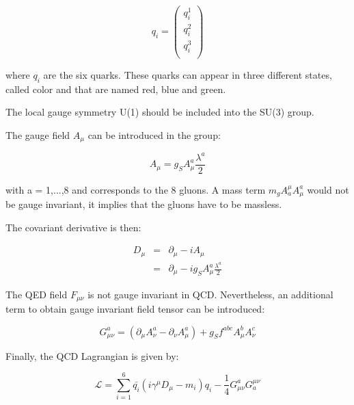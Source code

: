    \begin{equation}
      q_i = 
        \begin{pmatrix}
          q_i^1 \\
          q_i^2 \\
          q_i^3 \\
        \end{pmatrix}
     \end{equation}
    
    where $q_i$ are the six quarks.
    These quarks can appear in three different states, called color and that are named red, blue and green.

    The local gauge symmetry U(1) should be included into the SU(3) group.
    
    The gauge field $A_{\mu}$ can be introduced in the group:
    
    \begin{equation}
      A_{\mu} = g_S A^a_{\mu}\frac{\lambda^a}{2}
    \end{equation}
     
    with a = 1,...,8 and corresponds to the 8 gluons.
    A mass term  $m_g A^{\mu}_a A^a_{\mu}$ would not be gauge invariant, it implies that the gluons have to be massless.

    The covariant derivative is then:

    \begin{equation}
      \begin{array}{rcl}
        D_{\mu} & = & \partial_{\mu} - i A_{\mu} \\
                & = & \partial_{\mu} - i g_S A^a_{\mu} \frac{\lambda^a}{2}
      \end{array}
    \end{equation}

    The QED field $F_{\mu \nu}$ is not gauge invariant in QCD.
    Nevertheless, an additional term to obtain gauge invariant field tensor can be introduced:
    
    \begin{equation}
      G^a_{\mu \nu} = \left( \partial_{\mu} A^a_{\nu} - \partial_{\nu} A^a_{\mu} \right) + g_S f^{abc} A^b_{\mu} A^c_{\nu}
    \end{equation} 

    Finally, the QCD Lagrangian is given by:

    \begin{equation}
      \mathcal{L} = \sum_{i=1}^6  \bar{q_i} \left(i \gamma^{\mu}D_{\mu} -m_i \right)q_i - \frac{1}{4} G_{\mu \nu}^{a} G_{a}^{\mu \nu}
    \end{equation}
    

